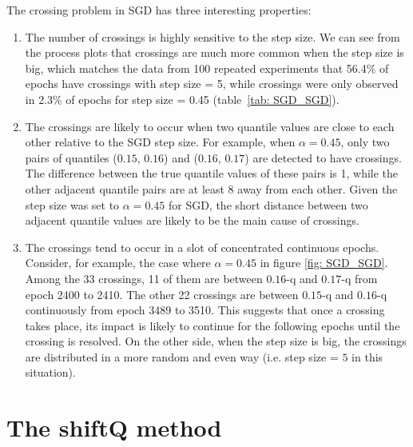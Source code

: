 The crossing problem in SGD has three interesting properties:
\begin{enumerate}

    \item The number of crossings is highly sensitive to the step size. We can see from the process plots that crossings are much more common when the step size is big, which matches the data from 100 repeated experiments that 56.4\% of epochs have crossings with step size = 5, while crossings were only observed in 2.3\% of epochs for step size = 0.45 (table~\ref{tab: SGD_SGD}).

    \item The crossings are likely to occur when two quantile values are close to each other relative to the SGD step size. For example, when $\alpha=0.45$, only two pairs of quantiles ($0.15$, $0.16$) and ($0.16$, $0.17$) are detected to have crossings. The difference between the true quantile values of these pairs is 1, while the other adjacent quantile pairs are at least 8 away from each other. Given the step size was set to $\alpha = 0.45$ for SGD, the short distance between two adjacent quantile values are likely to be the main cause of crossings.
    
    \item The crossings tend to occur in a slot of concentrated continuous epochs. Consider, for example, the case where $\alpha = 0.45$ in figure \ref{fig: SGD_SGD}. Among the 33 crossings, 11 of them are between $0.16$-q and $0.17$-q from epoch 2400 to 2410. The other 22 crossings are between $0.15$-q and $0.16$-q continuously from epoch 3489 to 3510. This suggests that once a crossing takes place, its impact is likely to continue for the following epochs until the crossing is resolved. On the other side, when the step size is big, the crossings are distributed in a more random and even way (i.e. step size = $5$ in this situation).
    
\end{enumerate}

\section{The shiftQ method}
\label{sec: multi_shiftQ}

